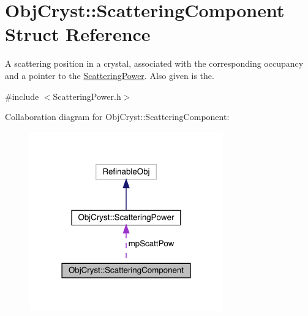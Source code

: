 \hypertarget{struct_obj_cryst_1_1_scattering_component}{}\section{Obj\+Cryst\+::Scattering\+Component Struct Reference}
\label{struct_obj_cryst_1_1_scattering_component}


A scattering position in a crystal, associated with the corresponding occupancy and a pointer to the \mbox{\hyperlink{class_obj_cryst_1_1_scattering_power}{Scattering\+Power}}. Also given is the.  




{\ttfamily \#include $<$Scattering\+Power.\+h$>$}



Collaboration diagram for Obj\+Cryst\+::Scattering\+Component\+:
\nopagebreak
\begin{figure}[H]
\begin{center}
\leavevmode
\includegraphics[width=237pt]{struct_obj_cryst_1_1_scattering_component__coll__graph}
\end{center}
\end{figure}
